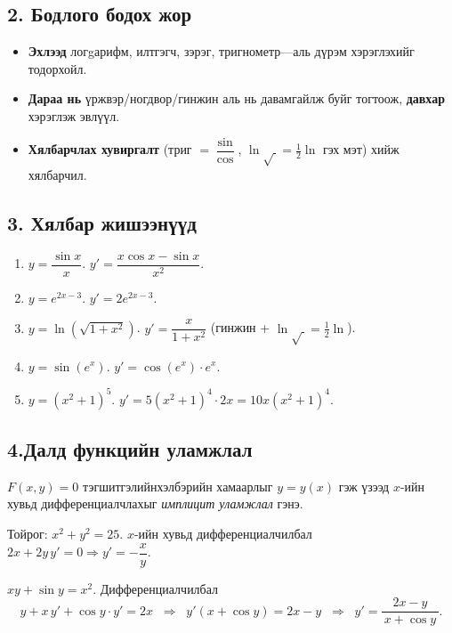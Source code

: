 \subsection*{2. Бодлого бодох жор}
\begin{itemize}
  \item \textbf{Эхлээд} логgарифм, илтгэгч, зэрэг, тригнометр—аль дүрэм хэрэглэхийг тодорхойл.
  \item \textbf{Дараа нь} үржвэр/ногдвор/гинжин аль нь давамгайлж буйг тогтоож, \textbf{давхар} хэрэглэж эвлүүл.
  \item \textbf{Хялбарчлах хувиргалт} (триг $=\dfrac{\sin}{\cos}$, $\ln\sqrt{\ }=\tfrac12\ln$ гэх мэт) хийж хялбарчил.
\end{itemize}

\subsection*{3. Хялбар жишээнүүд}
\begin{example}
\begin{enumerate}
  \item $y=\dfrac{\sin x}{x}$.\; $y'=\dfrac{x\cos x-\sin x}{x^2}$.
  \item $y=e^{2x-3}$.\; $y'=2e^{2x-3}$.
  \item $y=\ln(\sqrt{1+x^2})$.\; $y'=\dfrac{x}{1+x^2}$ \; (гинжин + $\ln\sqrt{\ }=\tfrac12\ln$).
  \item $y=\sin(e^x)$.\; $y'=\cos(e^x)\cdot e^x$.
  \item $y=(x^2+1)^{5}$.\; $y'=5(x^2+1)^{4}\cdot 2x=10x(x^2+1)^4$.
\end{enumerate}
\end{example}

\subsection*{4.Далд функцийн уламжлал}
\begin{definition}
$F(x,y)=0$ тэгшитгэлийнхэлбэрийн хамаарлыг $y=y(x)$ гэж үзээд $x$-ийн хувьд дифференциалчлахыг \emph{имплицит уламжлал} гэнэ.
\end{definition}

\begin{example}
Тойрог: $x^2+y^2=25$. $x$-ийн хувьд дифференциалчилбал $2x+2y\,y'=0 \Rightarrow y'=-\dfrac{x}{y}$.
\end{example}

\begin{example}
$xy+\sin y = x^2$. Дифференциалчилбал
\[
y + x\,y' + \cos y \cdot y' = 2x 
\;\;\Rightarrow\;\;
y'(x+\cos y)=2x-y
\;\;\Rightarrow\;\;
\boxed{y'=\dfrac{2x-y}{\,x+\cos y\,}}.
\]
\end{example}

